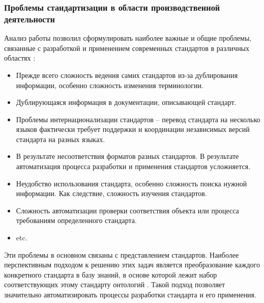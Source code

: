 \subsubsection{Проблемы стандартизации в области производственной деятельности}

Анализ работы позволил сформулировать наиболее важные и общие проблемы, связанные с разработкой и применением современных стандартов в различных областях \cite{Серенков-2004,Углев-2012}:

\begin{itemize}
\item Прежде всего сложность ведения самих стандартов из-за дублирования информации, особенно сложность изменения терминологии.
\item Дублирующаяся информация в документации, описывающей стандарт.
\item Проблемы интернационализации стандартов -- перевод стандарта на несколько языков фактически требует поддержки и координации независимых версий стандарта на разных языках.
\item В результате несоответствия форматов разных стандартов. В результате автоматизация процесса разработки и применения стандартов усложняется.
\item Неудобство использования стандарта, особенно сложность поиска нужной информации. Как следствие, сложность изучения стандартов.
\item Сложность автоматизации проверки соответствия объекта или процесса требованиям определенного стандарта.
\item etc.
\end{itemize}

Эти проблемы в основном связаны с представлением стандартов. Наиболее перспективным подходом к решению этих задач является преобразование каждого конкретного стандарта в базу знаний, в основе которой лежит набор соответствующих этому стандарту онтологий \cite{Golenkov2019,Серенков-2004,Углев-2012,Совершенствование-2017,ISA-88-формализация}. Такой подход позволяет значительно автоматизировать процессы разработки стандарта и его применения.

